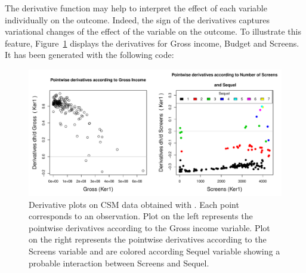The derivative function may help to interpret the effect of each variable individually on the outcome. Indeed, the sign of the derivatives captures variational changes of the effect of the variable on the outcome. To illustrate this feature, Figure~\ref{fig:csm_Figure2} displays the derivatives for Gross income, Budget and Screens. It has been generated with the following code:




\begin{figure}[htbp]
\centering
\includegraphics[width = \textwidth]{figure2.pdf}
\caption{\label{fig:csm_Figure2} Derivative plots on CSM data obtained with . Each point corresponds to an observation. Plot on the left represents the pointwise derivatives according to the Gross income variable. Plot on the right represents the pointwise derivatives according to the Screens variable and are colored according Sequel variable showing a probable interaction between Screens and Sequel.}
\end{figure}

